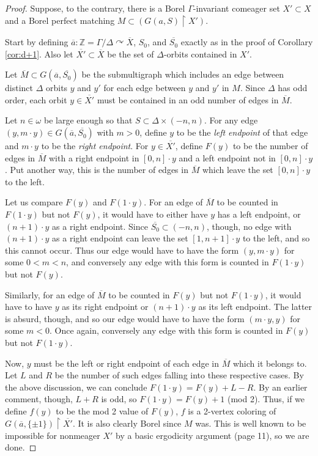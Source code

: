 \documentclass[12pt]{article}
\newcommand{\0}{\varnothing}
\newcommand{\Z}{\mathbb{Z}}
\newcommand{\res}{\upharpoonright}
\begin{document}
\begin{proof}
Suppose, to the contrary, there is a Borel $\Gamma$-invariant comeager set $X' \subset X$ and a Borel perfect matching $M \subset (G(a,S) \res X'
)$. 

Start by defining $\overline{a}:\Z = \Gamma/\Delta \curvearrowright \overline{X}$, $S_0$, and $\overline{S_0}$ exactly as in the proof of Corollary \ref{cor:d+1}. Also let $\overline{X'} \subset \overline{X}$ be the set of $\Delta$-orbits contained in $X'$.

Let $\overline{M} \subset G(\overline{a},\overline{S_0})$ be the submultigraph which includes an edge between distinct $\Delta$ orbits $y$ and $y'$ for each edge between $y$ and $y'$ in $M$. Since $\Delta$ has odd order, each orbit $y \in \overline{X'}$ must be contained in an odd number of edges in $\overline{M}$.

Let $n \in \omega$ be large enough so that $S \subset \Delta \times (-n,n)$. For any edge $(y,m \cdot y) \in G(\overline{a},\overline{S_0})$ with $m > 0$, define $y$ to be the \textit{left endpoint} of that edge and $m \cdot y$ to be the \textit{right endpoint}. For $y \in \overline{X'}$, define $F(y)$ to be the number of edges in $\overline{M}$ with a right endpoint in $[0,n] \cdot y$ and a left endpoint not in $[0,n] \cdot y$. Put another way, this is the number of edges in $\overline{M}$ which leave the set $[0,n] \cdot y$ to the left.

Let us compare $F(y)$ and $F(1 \cdot y)$. For an edge of $\overline{M}$ to be counted in $F(1 \cdot y)$ but not $F(y)$, it would have to either have $y$ has a left endpoint, or $(n+1) \cdot y$ as a right endpoint. Since $\overline{S_0} \subset (-n,n)$, though, no edge with $(n+1) \cdot y$ as a right endpoint can leave the set $[1,n+1] \cdot y$ to the left, and so this cannot occur. Thus our edge would have to have the form $(y,m \cdot y)$ for some $0 < m < n$, and conversely any edge with this form is counted in $F(1 \cdot y)$ but not $F(y)$. 

Similarly, for an edge of $\overline{M}$ to be counted in $F(y)$ but not $F(1 \cdot y)$, it would have to have $y$ as its right endpoint or $(n+1) \cdot y$ as its left endpoint.  The latter is absurd, though, and so our edge would have to have the form $(m \cdot y, y)$ for some $m < 0$. Once again, conversely any edge with this form is counted in $F(y)$ but not $F(1 \cdot y)$.

Now, $y$ must be the left or right endpoint of each edge in $\overline{M}$ which it belongs to. Let $L$ and $R$ be the number of such edges falling into these respective cases. By the above discussion, we can conclude $F(1 \cdot y) = F(y)  + L - R$. By an earlier comment, though, $L+R$ is odd, so $F(1 \cdot y) = F(y) + 1$ (mod 2). Thus, if we define $f(y)$ to be the mod 2 value of $F(y)$, $f$ is a 2-vertex coloring of $G(\overline{a},\{\pm 1\}) \res \overline{X'}$. It is also clearly Borel since $M$ was. This is well known to be impossible for nonmeager $X'$ by a basic ergodicity argument \cite{KST} (page 11), so we are done. 


\end{proof}
\end{document}
